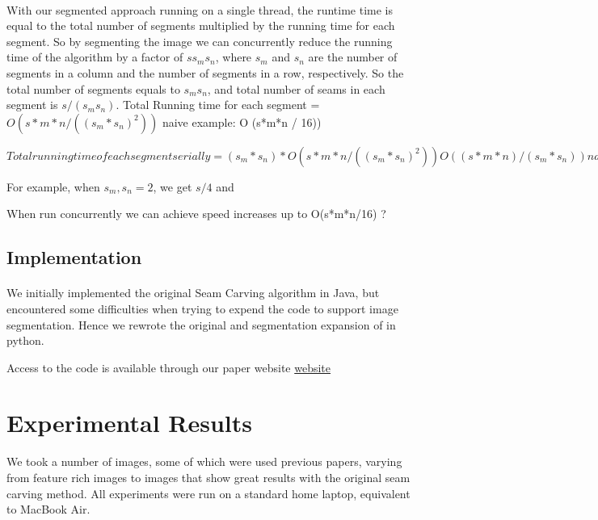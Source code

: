\documentclass[conference]{acmsiggraph}
\begin{document}
\paragraph{}
With our segmented approach running on a single thread, the runtime time is equal to the total number of segments multiplied by the running time for each segment. So by segmenting the image we can concurrently reduce the running time of the algorithm by a factor of $s s_m s_n$, where $s_m$ and $s_n$ are the number of segments in a column and the number of segments in a row, respectively. So the total number of segments equals to $s_m s_n$, and total number of seams in each segment is $s/(s_m s_n).$ 
Total Running time for each segment = $O( s*m*n / ((s_m*s_n)^2) )$ naive example: O (s*m*n / 16))

$Total running time of each segment serially = (s_m*s_n) * O( s*m*n / ((s_m*s_n)^2) ) 
O( (s*m*n)/(s_m*s_n) ) naive example: 4 * O (s*m*n/16) = O(s*m*n/4) - when run serially$

For example, when $s_m,s_n=2$, we get $s/4$ and 


When run concurrently we can achieve speed increases up to O(s*m*n/16) ?



\subsection{Implementation}

\paragraph{}
We initially implemented the original Seam Carving algorithm in Java, but encountered some difficulties when trying to expend the code to support image segmentation. Hence we rewrote the original and segmentation expansion of in python. 

Access to the code is available through our paper website  \href{http://cs269uclawinter2014.wordpress.com/}{website}


\section{Experimental Results}

We took a number of images, some of which were used previous papers, varying from feature rich images to images that show great results with the original seam carving method. All experiments were run on a standard home laptop, equivalent to MacBook Air.
\end{document}
